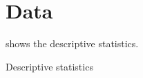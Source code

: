 \section{Data}
\label{s:data}
 shows the descriptive statistics.

\begin{table}
    \centering
    \caption{Descriptive statistics}
    \label{t:descriptive}
\end{table}

\begin{figure}
    \centering
\end{figure}
